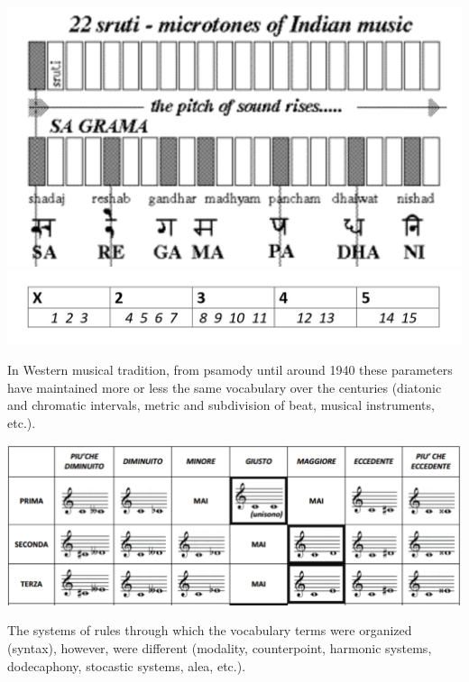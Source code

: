 \begin{center}
\includegraphics[scale=0.6]{../img/india.png}\break
\includegraphics[scale=0.5]{../img/rtmoindia.png}
\end{center}

In Western musical tradition, from psamody until around 1940 these parameters have maintained more or less the same vocabulary over the centuries (diatonic and chromatic intervals, metric and subdivision of beat, musical instruments, etc.).

\begin{center}
\includegraphics[scale=1]{../img/intervalli.png}
\end{center}

The systems of rules through which the vocabulary terms were organized (syntax), however, were different (modality, counterpoint, harmonic systems, dodecaphony, stocastic systems, alea, etc.).

